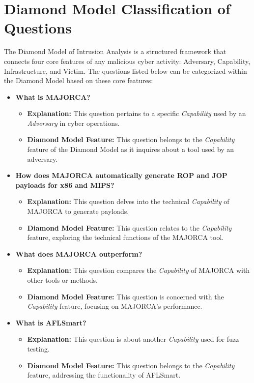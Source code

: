 \documentclass{article}
\begin{document}
\section*{Diamond Model Classification of Questions}

The Diamond Model of Intrusion Analysis is a structured framework that connects four core features of any malicious cyber activity: Adversary, Capability, Infrastructure, and Victim. The questions listed below can be categorized within the Diamond Model based on these core features:

\begin{itemize}
    \item \textbf{What is MAJORCA?}
    \begin{itemize}
        \item \textbf{Explanation:} This question pertains to a specific \textit{Capability} used by an \textit{Adversary} in cyber operations.
        \item \textbf{Diamond Model Feature:} This question belongs to the \textit{Capability} feature of the Diamond Model as it inquires about a tool used by an adversary.
    \end{itemize}
    
    \item \textbf{How does MAJORCA automatically generate ROP and JOP payloads for x86 and MIPS?}
    \begin{itemize}
        \item \textbf{Explanation:} This question delves into the technical \textit{Capability} of MAJORCA to generate payloads.
        \item \textbf{Diamond Model Feature:} This question relates to the \textit{Capability} feature, exploring the technical functions of the MAJORCA tool.
    \end{itemize}
    
    \item \textbf{What does MAJORCA outperform?}
    \begin{itemize}
        \item \textbf{Explanation:} This question compares the \textit{Capability} of MAJORCA with other tools or methods.
        \item \textbf{Diamond Model Feature:} This question is concerned with the \textit{Capability} feature, focusing on MAJORCA's performance.
    \end{itemize}
    
    \item \textbf{What is AFLSmart?}
    \begin{itemize}
        \item \textbf{Explanation:} This question is about another \textit{Capability} used for fuzz testing.
        \item \textbf{Diamond Model Feature:} This question belongs to the \textit{Capability} feature, addressing the functionality of AFLSmart.
    \end{itemize}
    

\end{itemize}
\end{document}
